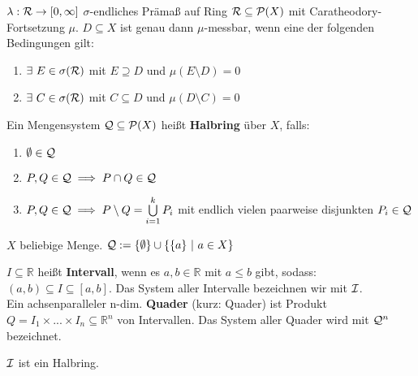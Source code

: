   \newpage

  \begin{lemma}[i.A. II.17]
    $\lambda: \mathcal{R} \to [0, \infty]$ $\sigma$-endliches Prämaß auf Ring $\mathcal{R} \subseteq \mathcal{P}(X)$ mit Caratheodory-Fortsetzung $\mu$. $D \subseteq X$ ist genau dann $\mu$-messbar, wenn eine der folgenden Bedingungen gilt:
    \begin{enumerate}[label=\roman*)]
      \item $\exists \ E \in \sigma(\mathcal{R})$ mit $E \supseteq D$ und $\mu(E \setminus D) = 0$
      \item $\exists \ C \in \sigma(\mathcal{R})$ mit $C \subseteq D$ und $\mu(D \setminus C) = 0$
    \end{enumerate}
  \end{lemma}

  \begin{definition}
    Ein Mengensystem $\mathcal{Q} \subseteq \mathcal{P}(X)$ heißt \textbf{Halbring} über $X$, falls:
    \begin{enumerate}[label=\roman*)]
      \item $\emptyset \in \mathcal{Q}$
      \item $P, Q \in \mathcal{Q} \implies P \cap Q \in \mathcal{Q}$
      \item $P, Q \in \mathcal{Q} \implies P \setminus Q = \bigcup\limits_{i=1}^k P_i$ mit endlich vielen paarweise disjunkten $P_i \in \mathcal{Q}$
    \end{enumerate}
  \end{definition}

  \begin{example}
    $X$ beliebige Menge. $\mathcal{Q} := \{\emptyset\} \cup \{\{a\} \ | \ a \in X\}$
  \end{example}

  \begin{remark}
    $I \subseteq \mathbb{R}$ heißt \textbf{Intervall}, wenn es $a,b \in \mathbb{R}$ mit $a \leq b$ gibt, sodass: $(a,b) \subseteq I \subseteq [a,b]$. Das System aller Intervalle bezeichnen wir mit $\mathcal{I}$.\\
    Ein achsenparalleler n-dim. \textbf{Quader} (kurz: Quader) ist Produkt $Q = I_1 \times ... \times I_n \subseteq \mathbb{R}^n$ von Intervallen. Das System aller Quader wird mit $\mathcal{Q}^n$ bezeichnet.
  \end{remark}

  \begin{theorem}[i.A. II.19]
    $\mathcal{I}$ ist ein Halbring.
  \end{theorem}


